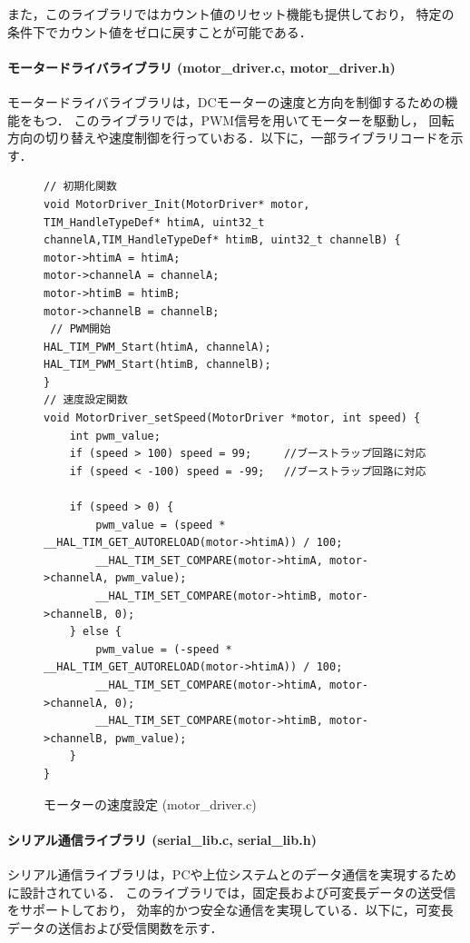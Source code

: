 また，このライブラリではカウント値のリセット機能も提供しており，
特定の条件下でカウント値をゼロに戻すことが可能である．

\paragraph{モータードライバライブラリ (motor\_driver.c, motor\_driver.h)}
モータードライバライブラリは，DCモーターの速度と方向を制御するための機能をもつ．
このライブラリでは，PWM信号を用いてモーターを駆動し，
回転方向の切り替えや速度制御を行っていおる．以下に，一部ライブラリコードを示す．

\begin{figure}[H]
    \centering
    \begin{lstlisting}
// 初期化関数
void MotorDriver_Init(MotorDriver* motor, TIM_HandleTypeDef* htimA, uint32_t channelA,TIM_HandleTypeDef* htimB, uint32_t channelB) {
motor->htimA = htimA;
motor->channelA = channelA;
motor->htimB = htimB;
motor->channelB = channelB;    
 // PWM開始
HAL_TIM_PWM_Start(htimA, channelA);
HAL_TIM_PWM_Start(htimB, channelB);
}
// 速度設定関数
void MotorDriver_setSpeed(MotorDriver *motor, int speed) {
    int pwm_value;
    if (speed > 100) speed = 99;     //ブーストラップ回路に対応
    if (speed < -100) speed = -99;   //ブーストラップ回路に対応
        
    if (speed > 0) {
        pwm_value = (speed * __HAL_TIM_GET_AUTORELOAD(motor->htimA)) / 100;
        __HAL_TIM_SET_COMPARE(motor->htimA, motor->channelA, pwm_value);
        __HAL_TIM_SET_COMPARE(motor->htimB, motor->channelB, 0);
    } else {
        pwm_value = (-speed * __HAL_TIM_GET_AUTORELOAD(motor->htimA)) / 100;
        __HAL_TIM_SET_COMPARE(motor->htimA, motor->channelA, 0);
        __HAL_TIM_SET_COMPARE(motor->htimB, motor->channelB, pwm_value);
    }
}
    \end{lstlisting}
    \caption{モーターの速度設定 (motor\_driver.c)}
    \label{lst:motor_speed}
\end{figure}

\paragraph{シリアル通信ライブラリ (serial\_lib.c, serial\_lib.h)}
シリアル通信ライブラリは，PCや上位システムとのデータ通信を実現するために設計されている．
このライブラリでは，固定長および可変長データの送受信をサポートしており，
効率的かつ安全な通信を実現している．以下に，可変長データの送信および受信関数を示す．

